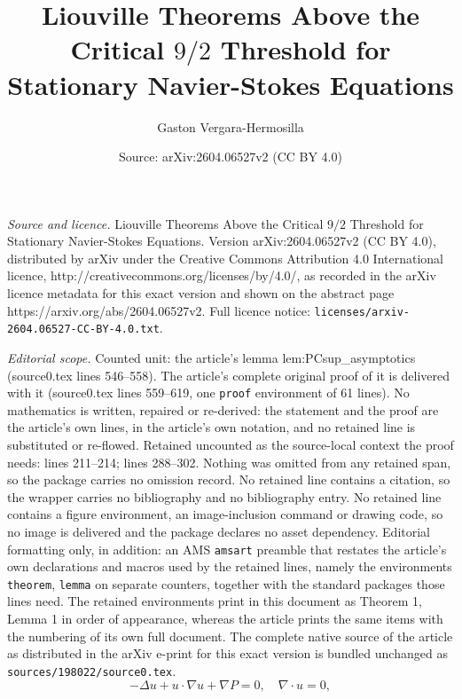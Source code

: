 \documentclass[10pt,a4paper]{amsart}
\title{Liouville Theorems Above the Critical $9/2$ Threshold for Stationary Navier-Stokes Equations}
\author{Gaston Vergara-Hermosilla}
\date{Source: arXiv:2604.06527v2 (CC BY 4.0)}
\begin{document}
\maketitle

\noindent\emph{Source and licence.} Liouville Theorems Above the Critical $9/2$ Threshold for Stationary Navier-Stokes Equations. Version arXiv:2604.06527v2 (CC BY 4.0), distributed by arXiv under the Creative Commons Attribution 4.0 International licence, http://creativecommons.org/licenses/by/4.0/, as recorded in the arXiv licence metadata for this exact version and shown on the abstract page https://arxiv.org/abs/2604.06527v2. Full licence notice: \texttt{licenses/arxiv-2604.06527-CC-BY-4.0.txt}.\par\smallskip

\noindent\textit{Editorial scope.} Counted unit: the article's lemma lem:PCsup\_asymptotics (source0.tex lines 546--558). The article's complete original proof of it is delivered with it (source0.tex lines 559--619, one \texttt{proof} environment of 61 lines). No mathematics is written, repaired or re-derived: the statement and the proof are the article's own lines, in the article's own notation, and no retained line is substituted or re-flowed.  Retained uncounted as the source-local context the proof needs: lines 211--214; lines 288--302.  Nothing was omitted from any retained span, so the package carries no omission record.  No retained line contains a citation, so the wrapper carries no bibliography and no bibliography entry.  No retained line contains a figure environment, an image-inclusion command or drawing code, so no image is delivered and the package declares no asset dependency.  Editorial formatting only, in addition: an AMS \texttt{amsart} preamble that restates the article's own declarations and macros used by the retained lines, namely the environments \texttt{theorem}, \texttt{lemma} on separate counters, together with the standard packages those lines need.  The retained environments print in this document as Theorem 1, Lemma 1 in order of appearance, whereas the article prints the same items with the numbering of its own full document.  The complete native source of the article as distributed in the arXiv e-print for this exact version is bundled unchanged as \texttt{sources/198022/source0.tex}.
\begin{equation}\label{SNS}
-\Delta u + u \cdot \nabla u + \nabla P = 0, \quad 
\nabla \cdot u = 0,
\end{equation}
\end{document}
